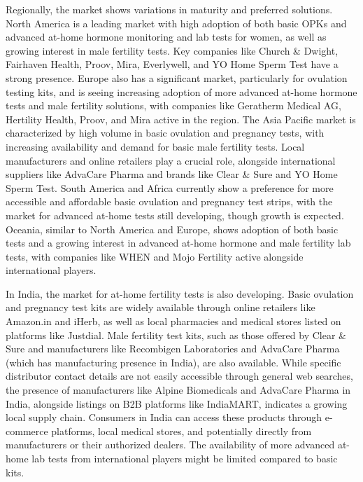 \documentclass{article}
\begin{document}
Regionally, the market shows variations in maturity and preferred solutions. North America is a leading market with high adoption of both basic OPKs and advanced at-home hormone monitoring and lab tests for women, as well as growing interest in male fertility tests. Key companies like Church \& Dwight, Fairhaven Health, Proov, Mira, Everlywell, and YO Home Sperm Test have a strong presence. Europe also has a significant market, particularly for ovulation testing kits, and is seeing increasing adoption of more advanced at-home hormone tests and male fertility solutions, with companies like Geratherm Medical AG, Hertility Health, Proov, and Mira active in the region. The Asia Pacific market is characterized by high volume in basic ovulation and pregnancy tests, with increasing availability and demand for basic male fertility tests. Local manufacturers and online retailers play a crucial role, alongside international suppliers like AdvaCare Pharma and brands like Clear \& Sure and YO Home Sperm Test. South America and Africa currently show a preference for more accessible and affordable basic ovulation and pregnancy test strips, with the market for advanced at-home tests still developing, though growth is expected. Oceania, similar to North America and Europe, shows adoption of both basic tests and a growing interest in advanced at-home hormone and male fertility lab tests, with companies like WHEN and Mojo Fertility active alongside international players.

In India, the market for at-home fertility tests is also developing. Basic ovulation and pregnancy test kits are widely available through online retailers like Amazon.in and iHerb, as well as local pharmacies and medical stores listed on platforms like Justdial. Male fertility test kits, such as those offered by Clear \& Sure and manufacturers like Recombigen Laboratories and AdvaCare Pharma (which has manufacturing presence in India), are also available. While specific distributor contact details are not easily accessible through general web searches, the presence of manufacturers like Alpine Biomedicals and AdvaCare Pharma in India, alongside listings on B2B platforms like IndiaMART, indicates a growing local supply chain. Consumers in India can access these products through e-commerce platforms, local medical stores, and potentially directly from manufacturers or their authorized dealers. The availability of more advanced at-home lab tests from international players might be limited compared to basic kits.
\end{document}
